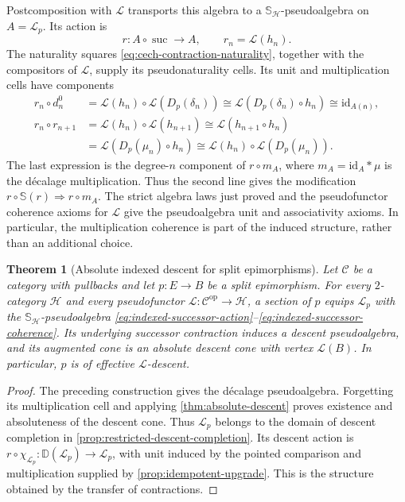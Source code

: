 \documentclass[11pt,a4paper]{article}
\numberwithin{equation}{section}
\newtheorem{theorem}{Theorem}[section]
\theoremstyle{definition}
\theoremstyle{remark}
\newcommand{\id}{\mathrm{id}}
\newcommand{\Hcat}{\mathcal H}
\newcommand{\C}{\mathcal C}
\newcommand{\Lx}{\mathcal L}
\newcommand{\suc}{\operatorname{suc}}
\newcommand{\Dmon}{\mathbb D}
\newcommand{\Smon}{\mathbb S}
\begin{document}
Postcomposition with $\Lx$ transports this algebra to a
$\Smon_{\Hcat}$-pseudoalgebra on $A=\Lx_p$. Its action is
\begin{equation}
  r\colon A\circ\suc\longrightarrow A,
  \qquad r_n=\Lx(h_n).
  \label{eq:indexed-successor-action}
\end{equation}
The naturality squares \eqref{eq:cech-contraction-naturality},
together with the compositors of $\Lx$, supply its pseudonaturality
cells. Its unit and multiplication cells have components
\begin{equation}
\begin{aligned}
  r_n\circ d_n^0
  &=\Lx(h_n)\circ\Lx(D_p(\delta_n))
    \cong\Lx(D_p(\delta_n)\circ h_n)
    \cong\id_{A(\mathsf n)},\\
  r_n\circ r_{n+1}
  &=\Lx(h_n)\circ\Lx(h_{n+1})
    \cong\Lx(h_{n+1}\circ h_n)\\
  &=\Lx(D_p(\mu_n)\circ h_n)
    \cong\Lx(h_n)\circ\Lx(D_p(\mu_n)).
\end{aligned}
\label{eq:indexed-successor-coherence}
\end{equation}
The last expression is the degree-$n$ component of $r\circ m_A$,
where $m_A=\id_A\ast\mu$ is the d\'ecalage multiplication. Thus the second
line gives the modification $r\circ\Smon(r)\Rightarrow r\circ m_A$.
The strict algebra laws just proved and the pseudofunctor coherence
axioms for $\Lx$ give the pseudoalgebra unit and associativity
axioms. In particular, the multiplication coherence is part of the
induced structure, rather than an additional choice.

\begin{theorem}[Absolute indexed descent for split epimorphisms]
\label{thm:split-absolute}
Let $\C$ be a category with pullbacks and let $p\colon E\to B$ be a
split epimorphism. For every $2$-category $\Hcat$ and every
pseudofunctor $\Lx\colon\C^{\mathrm{op}}\to\Hcat$, a
section of $p$ equips $\Lx_p$ with the $\Smon_{\Hcat}$-pseudoalgebra
\eqref{eq:indexed-successor-action}--\eqref{eq:indexed-successor-coherence}.
Its underlying successor contraction induces a descent pseudoalgebra,
and its augmented cone is an absolute descent cone with vertex
$\Lx(B)$. In particular, $p$ is of effective $\Lx$-descent.
\end{theorem}

\begin{proof}
The preceding construction gives the d\'ecalage pseudoalgebra.
Forgetting its multiplication cell and applying
\cref{thm:absolute-descent} proves existence and absoluteness of the
descent cone. Thus $\Lx_p$ belongs to the domain of descent completion
in \cref{prop:restricted-descent-completion}. Its descent action is
$r\circ\chi_{\Lx_p}\colon\Dmon(\Lx_p)\to\Lx_p$, with unit induced by the
pointed comparison and multiplication supplied by
\cref{prop:idempotent-upgrade}. This is the structure obtained by
the transfer of contractions.
\end{proof}
\end{document}

